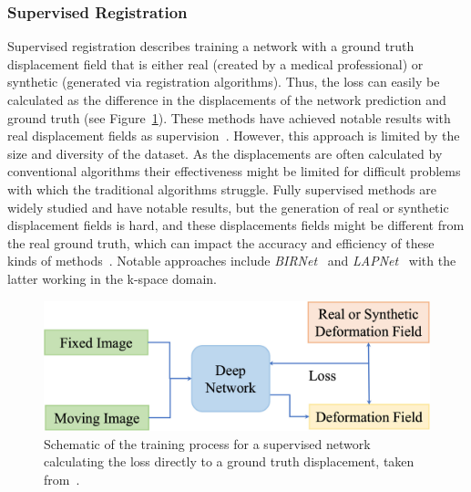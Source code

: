 \subsubsection{Supervised Registration} \label{SubSubSec:SupervisedRegistration}
Supervised registration describes training a network with a ground truth displacement field that is either real (created by a medical professional) or synthetic (generated via registration algorithms). Thus, the loss can easily be calculated as the difference in the displacements of the network prediction and ground truth (see Figure~\ref{fig:SupervisedRegistration}). These methods have achieved notable results with real displacement fields as supervision~\cite{Zou2022}. However, this approach is limited by the size and diversity of the dataset. As the displacements are often calculated by conventional algorithms their effectiveness might be limited for difficult problems with which the traditional algorithms struggle. Fully supervised methods are widely studied and have notable results, but the generation of real or synthetic displacement fields is hard, and these displacements fields might be different from the real ground truth, which can impact the accuracy and efficiency of these kinds of methods~\cite{Zou2022}. Notable approaches include \emph{BIRNet}~\cite{BIRNet} and \emph{LAPNet}~\cite{LAPNet} with the latter working in the k-space domain.

\begin{figure}[h] %
	\centering
	\graphicspath{{images/}{\main/images/}}
	\includegraphics[width=\linewidth]{SupervisedRegistrationGraph.jpg} 
	\caption{Schematic of the training process for a supervised network calculating the loss directly to a ground truth displacement, taken from~\cite{Zou2022}.}
	\label{fig:SupervisedRegistration}
\end{figure}


